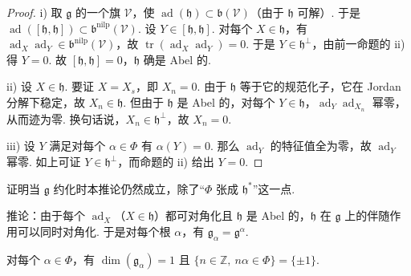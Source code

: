 \begin{proof}
i) 取 $\mathfrak g$ 的一个旗 $\mathcal V$，使 $\operatorname{ad}(\mathfrak h)\subset\mathfrak b(\mathcal V)$（由于 $\mathfrak h$ 可解）. 于是 $\operatorname{ad}([\mathfrak h,\mathfrak h])\subset\mathfrak b^{\mathrm{nilp}}(\mathcal V)$. 设 $Y\in[\mathfrak h,\mathfrak h]$. 对每个 $X\in\mathfrak h$，有 $\operatorname{ad}_X\operatorname{ad}_Y\in\mathfrak b^{\mathrm{nilp}}(\mathcal V)$，故 $\operatorname{tr}(\operatorname{ad}_X\operatorname{ad}_Y)=0$. 于是 $Y\in\mathfrak h^\perp$，由前一命题的 ii) 得 $Y=0$. 故 $[\mathfrak h,\mathfrak h]=0$，$\mathfrak h$ 确是 Abel 的.

ii) 设 $X\in\mathfrak h$. 要证 $X=X_s$，即 $X_n=0$. 由于 $\mathfrak h$ 等于它的规范化子，它在 Jordan 分解下稳定，故 $X_n\in\mathfrak h$. 但由于 $\mathfrak h$ 是 Abel 的，对每个 $Y\in\mathfrak h$，$\operatorname{ad}_Y\operatorname{ad}_{X_n}$ 幂零，从而迹为零. 换句话说，$X_n\in\mathfrak h^\perp$，故 $X_n=0$.

iii) 设 $Y$ 满足对每个 $\alpha\in\Phi$ 有 $\alpha(Y)=0$. 那么 $\operatorname{ad}_Y$ 的特征值全为零，故 $\operatorname{ad}_Y$ 幂零. 如上可证 $Y\in\mathfrak h^\perp$，而命题的 ii) 给出 $Y=0$.
\end{proof}
\begin{exercise*}
证明当 $\mathfrak g$ 约化时本推论仍然成立，除了``$\Phi$ 张成 $\mathfrak h^*$''这一点.
\end{exercise*}
推论：由于每个 $\operatorname{ad}_X$（$X\in\mathfrak h$）都可对角化且 $\mathfrak h$ 是 Abel 的，$\mathfrak h$ 在 $\mathfrak g$ 上的伴随作用可以同时对角化. 于是对每个根 $\alpha$，有 $\mathfrak g_\alpha=\mathfrak g^\alpha$.
\begin{proposition}\label{prop:ssl-3-1-3}
对每个 $\alpha\in\Phi$，有 $\dim(\mathfrak g_\alpha)=1$ 且 $\{n\in\mathbb Z,\ n\alpha\in\Phi\}=\{\pm 1\}$.
\end{proposition}
